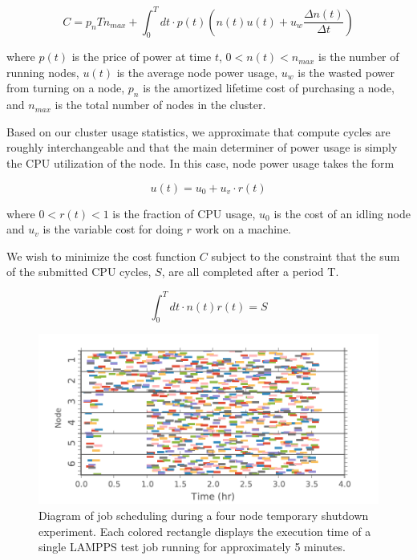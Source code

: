 $$C = p_n T n_{max} + \int_0^T dt \cdot p(t)\left (n(t)u(t)+ u_w \frac{\Delta n(t) }{\Delta t} \right )  $$

where $p(t)$ is the price of power at time $t$, $0<n(t)<n_{max}$ is the number of running nodes, $u(t)$ is the average node power usage, $u_w$ is the wasted power from turning on a node, $p_n$ is the amortized lifetime cost of purchasing a node, and $n_{max}$ is the total number of nodes in the cluster.  

Based on our cluster usage statistics, we approximate that compute cycles are roughly interchangeable and that the main determiner of power usage is simply the CPU utilization of the node. In this case, node power usage takes the form

$$u(t) = u_0 + u_v \cdot r(t)$$

where $0<r(t)<1$ is the fraction of CPU usage, $u_0$ is the cost of an idling node and $u_v$ is the variable cost for doing $r$ work on a machine.

We wish to minimize the cost function $C$ subject to the constraint that the sum of the submitted CPU cycles, $S$, are all completed after a period T.

$$\int_0^T dt \cdot n(t)r(t) = S$$

\begin{figure}[t]
	\begin{center}
		\includegraphics[scale=0.55]{edeals/usage_viz4}
	\end{center}
	\caption{Diagram of job scheduling during a four node temporary shutdown experiment. Each colored rectangle displays the execution time of a single LAMPPS test job running for approximately 5 minutes.}
	
\end{figure}

